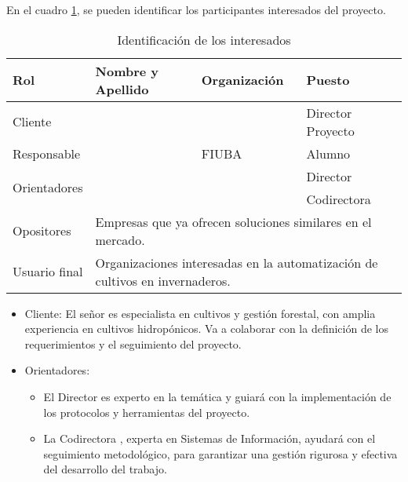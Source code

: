 En el cuadro \ref{tab:interesados}, se pueden identificar los participantes interesados del proyecto.


\begin{table}[ht]
	\begin{tabularx}{\linewidth}{|p{2.15cm}|p{5.8cm}|p{2.85cm}|p{3.4cm}|}
		\hline
		\rowcolor[HTML]{C0C0C0}
		Rol                           & Nombre y Apellido                                                                              & Organización    & Puesto            \\ \hline
		Cliente                       & \clientename                                                                                   & \empclientename & Director Proyecto \\ \hline
		Responsable                   & \authorname                                                                                    & FIUBA           & Alumno            \\ \hline
		\multirow{2}{*}{Orientadores} & \supname                                                                                       & \pertesupname   & Director          \\
		                              & \cosupname                                                                                     & \pertecosupname & Codirectora       \\ \hline
		Opositores                    & \multicolumn{3}{l|}{Empresas que ya ofrecen soluciones similares en el mercado.}                                                     \\ \hline
		Usuario final                 & \multicolumn{3}{l|}{Organizaciones interesadas en la automatización de cultivos en invernaderos.}                                       \\ \hline
	\end{tabularx}
	\caption{Identificación de los interesados}
	\label{tab:interesados}
\end{table}

\begin{itemize}
	\item Cliente: El señor \clientename\hspace{1px} es especialista en cultivos y gestión forestal, con amplia experiencia en
	      cultivos hidropónicos. Va a colaborar con la definición de los requerimientos y el seguimiento del proyecto.
	\item Orientadores:
	      \begin{itemize}
		      \item El Director \supname\hspace{1px} es experto en la temática y guiará con la
		            implementación de los protocolos y herramientas del proyecto.
		      \item La Codirectora \cosupname , experta en Sistemas de Información, ayudará con el
		            seguimiento metodológico, para garantizar una gestión rigurosa y efectiva del
		            desarrollo del trabajo.
	      \end{itemize}
\end{itemize}

